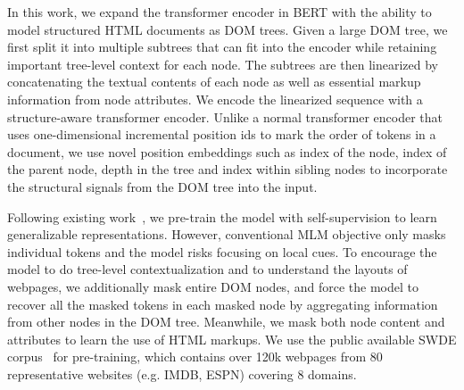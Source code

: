 \documentclass[sigconf, nonacm]{acmart}
\begin{document}
In this work, we expand the transformer encoder in BERT with the ability to model structured HTML documents as DOM trees. Given a large DOM tree, we first split it into multiple subtrees that can fit into the encoder while retaining important tree-level context for each node. The subtrees are then linearized by concatenating the textual contents of each node as well as essential markup information from node attributes. We encode the linearized sequence with a structure-aware transformer encoder. Unlike a normal transformer encoder that uses one-dimensional incremental position ids to mark the order of tokens in a document, we use novel position embeddings such as index of the node, index of the parent node, depth in the tree and index within sibling nodes to incorporate the structural signals from the DOM tree into the input.

Following existing work~\cite{devlin-etal-2019-bert}, we pre-train the model with self-supervision to learn generalizable representations. However, conventional MLM objective only masks individual tokens and the model risks focusing on local cues. To encourage the model to do tree-level contextualization and to understand the layouts of webpages, we additionally mask entire DOM nodes, and force the model to recover all the masked tokens {in each masked node} by aggregating information from other nodes in the DOM tree. Meanwhile, we mask both node content and attributes to learn the use of HTML markups. We use the public available SWDE corpus~\cite{swde} for pre-training, which contains over 120k webpages from 80 representative websites (e.g. IMDB, ESPN) covering 8 domains.
\end{document}
